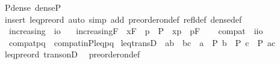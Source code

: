 \begin{isabellebody}
\isanewline
{}\isamarkupfalse%
\ P{\isacharunderscore}{\kern0pt}dense{\isacharcolon}{\kern0pt}\ {\isachardoublequoteopen}dense{\isacharparenleft}{\kern0pt}P{\isacharparenright}{\kern0pt}{\isachardoublequoteclose}\isanewline
%
\isadelimproof
\ \ %
\endisadelimproof
%
\isatagproof
{}\isamarkupfalse%
\ {\isacharparenleft}{\kern0pt}insert\ leq{\isacharunderscore}{\kern0pt}preord{\isacharcomma}{\kern0pt}\ auto\ simp\ add{\isacharcolon}{\kern0pt}\ preorder{\isacharunderscore}{\kern0pt}on{\isacharunderscore}{\kern0pt}def\ refl{\isacharunderscore}{\kern0pt}def\ dense{\isacharunderscore}{\kern0pt}def{\isacharparenright}{\kern0pt}%
\endisatagproof
{\isafoldproof}%
%
\isadelimproof
\isanewline
%
\endisadelimproof
\isanewline
{}\isamarkupfalse%
\ \isanewline
\ \ increasing\ {\isacharcolon}{\kern0pt}{\isacharcolon}{\kern0pt}\ {\isachardoublequoteopen}i{\isasymRightarrow}o{\isachardoublequoteclose}\ \isanewline
\ \ {\isachardoublequoteopen}increasing{\isacharparenleft}{\kern0pt}F{\isacharparenright}{\kern0pt}\ {\isasymequiv}\ {\isasymforall}x{\isasymin}F{\isachardot}{\kern0pt}\ {\isasymforall}\ p\ {\isasymin}\ P\ {\isachardot}{\kern0pt}\ x{\isasympreceq}p\ {\isasymlongrightarrow}\ p{\isasymin}F{\isachardoublequoteclose}\isanewline
\isanewline
{}\isamarkupfalse%
\ \isanewline
\ \ compat\ {\isacharcolon}{\kern0pt}{\isacharcolon}{\kern0pt}\ {\isachardoublequoteopen}i{\isasymRightarrow}i{\isasymRightarrow}o{\isachardoublequoteclose}\ \isanewline
\ \ {\isachardoublequoteopen}compat{\isacharparenleft}{\kern0pt}p{\isacharcomma}{\kern0pt}q{\isacharparenright}{\kern0pt}\ {\isasymequiv}\ compat{\isacharunderscore}{\kern0pt}in{\isacharparenleft}{\kern0pt}P{\isacharcomma}{\kern0pt}leq{\isacharcomma}{\kern0pt}p{\isacharcomma}{\kern0pt}q{\isacharparenright}{\kern0pt}{\isachardoublequoteclose}\isanewline
\isanewline
{}\isamarkupfalse%
\ leq{\isacharunderscore}{\kern0pt}transD{\isacharcolon}{\kern0pt}\ \ {\isachardoublequoteopen}a{\isasympreceq}b\ {\isasymLongrightarrow}\ b{\isasympreceq}c\ {\isasymLongrightarrow}\ a\ {\isasymin}\ P{\isasymLongrightarrow}\ b\ {\isasymin}\ P{\isasymLongrightarrow}\ c\ {\isasymin}\ P{\isasymLongrightarrow}\ a{\isasympreceq}c{\isachardoublequoteclose}\isanewline
%
\isadelimproof
\ \ %
\endisadelimproof
%
\isatagproof
{}\isamarkupfalse%
\ leq{\isacharunderscore}{\kern0pt}preord\ trans{\isacharunderscore}{\kern0pt}onD\ \isamarkupfalse%
\ preorder{\isacharunderscore}{\kern0pt}on{\isacharunderscore}{\kern0pt}def\ \isamarkupfalse%

\end{isabellebody}

